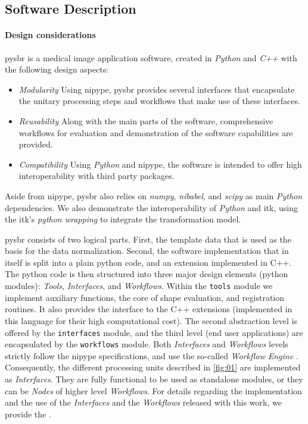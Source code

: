 \documentclass{frontiers}
\newcommand{\emitem}[1]{\item \emph{#1}}
\begin{document}
\subsection{Software Description}
\label{sec:software}
\paragraph{Design considerations}
\label{sec:design}

\Gls*{pysbr} is a medical image application software, created
  in \emph{Python} and \emph{C++} with the following design aspects:

\begin{itemize}
  \emitem{Modularity} Using \gls*{nipype}, \gls*{pysbr} provides
    several interfaces that encapsulate the unitary processing steps
    and workflows that make use of these interfaces.

  \emitem{Reusability} Along with the main parts of the software,
    comprehensive workflows for evaluation and demonstration of the 
    software capabilities are provided.

  \emitem{Compatibility} Using \emph{Python} and \gls*{nipype}, the
    software is intended to offer high interoperability with third party
      packages.
\end{itemize}

Aside from \gls*{nipype}, \Gls*{pysbr} also relies on \emph{numpy},
  \emph{nibabel}, and \emph{scipy} as main \emph{Python} dependencies.
We also demonstrate the interoperability of \emph{Python} and \gls*{itk},
  using the \gls*{itk}'s \emph{python wrapping} to integrate the
  transformation model. %

\Gls*{pysbr} consists of two logical parts.
First, the template data that is used as the basis for the data normalization.
Second, the software implementation that in itself is split into a plain
  python code, and an extension implemented in C++.
The python code is then structured into three major design elements (python modules):
  \emph{Tools}, \emph{Interfaces}, and \emph{Workflows}.
Within the \texttt{tools} module we implement auxiliary functions,
    the core of shape evaluation, and registration routines.
It also provides the interface to the C++ extensions
    (implemented in this language for their high computational cost).
The second abstraction level is offered by the \texttt{interfaces} module, and
  the third level (end user applications) are encapsulated by the \texttt{workflows} module.
Both \emph{Interfaces} and \emph{Workflows} levels strictly follow the
  \gls*{nipype} specifications, and use the so-called \emph{Workflow Engine}
  \citep{gorgolewski_nipype:_2011}.
Consequently, the different processing units described in \autoref{fig:01} 
  are implemented as \emph{Interfaces}. 
They are fully functional to be used as standalone modules, or 
  they can be \emph{Nodes} of higher level \emph{Workflows}.
For details regarding the implementation and the use of the \emph{Interfaces}
  and the \emph{Workflows} released with this work, we provide the .
\end{document}
